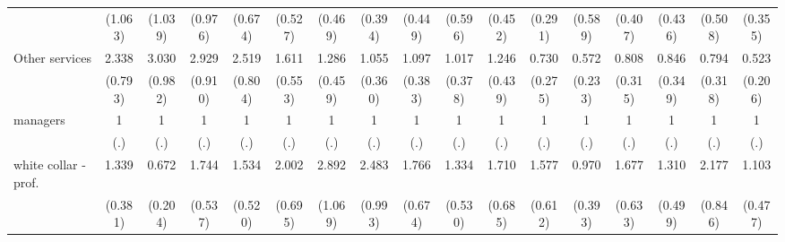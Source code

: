 {\begin{tabular}{l*{16}{c}}
                    &     (1.063)         &     (1.039)         &     (0.976)         &     (0.674)         &     (0.527)         &     (0.469)         &     (0.394)         &     (0.449)         &     (0.596)         &     (0.452)         &     (0.291)         &     (0.589)         &     (0.407)         &     (0.436)         &     (0.508)         &     (0.355)         \\
[1em]
Other services      &       2.338\sym{*}  &       3.030\sym{***}&       2.929\sym{***}&       2.519\sym{**} &       1.611         &       1.286         &       1.055         &       1.097         &       1.017         &       1.246         &       0.730         &       0.572         &       0.808         &       0.846         &       0.794         &       0.523         \\
                    &     (0.793)         &     (0.982)         &     (0.910)         &     (0.804)         &     (0.553)         &     (0.459)         &     (0.360)         &     (0.383)         &     (0.378)         &     (0.439)         &     (0.275)         &     (0.233)         &     (0.315)         &     (0.349)         &     (0.318)         &     (0.206)         \\
[1em]
managers            &           1         &           1         &           1         &           1         &           1         &           1         &           1         &           1         &           1         &           1         &           1         &           1         &           1         &           1         &           1         &           1         \\
                    &         (.)         &         (.)         &         (.)         &         (.)         &         (.)         &         (.)         &         (.)         &         (.)         &         (.)         &         (.)         &         (.)         &         (.)         &         (.)         &         (.)         &         (.)         &         (.)         \\
[1em]
white collar - prof.&       1.339         &       0.672         &       1.744         &       1.534         &       2.002\sym{*}  &       2.892\sym{**} &       2.483\sym{*}  &       1.766         &       1.334         &       1.710         &       1.577         &       0.970         &       1.677         &       1.310         &       2.177\sym{*}  &       1.103         \\
                    &     (0.381)         &     (0.204)         &     (0.537)         &     (0.520)         &     (0.695)         &     (1.069)         &     (0.993)         &     (0.674)         &     (0.530)         &     (0.685)         &     (0.612)         &     (0.393)         &     (0.633)         &     (0.499)         &     (0.846)         &     (0.477)         \\

\end{tabular}}
